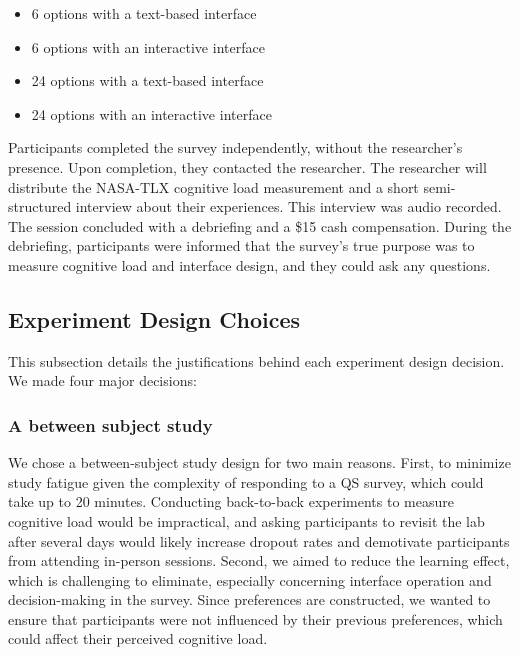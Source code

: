 \begin{itemize}
    \item 6 options with a text-based interface
    \item 6 options with an interactive interface
    \item 24 options with a text-based interface
    \item 24 options with an interactive interface
\end{itemize}

Participants completed the survey independently, without the researcher's presence. Upon completion, they contacted the researcher. The researcher will distribute the NASA-TLX cognitive load measurement and a short semi-structured interview about their experiences. This interview was audio recorded. The session concluded with a debriefing and a \$15 cash compensation. During the debriefing, participants were informed that the survey's true purpose was to measure cognitive load and interface design, and they could ask any questions.

\subsection{Experiment Design Choices}
This subsection details the justifications behind each experiment design decision. We made four major decisions:

\subsubsection{A between subject study}
We chose a between-subject study design for two main reasons. First, to minimize study fatigue given the complexity of responding to a QS survey, which could take up to 20 minutes. Conducting back-to-back experiments to measure cognitive load would be impractical, and asking participants to revisit the lab after several days would likely increase dropout rates and demotivate participants from attending in-person sessions. Second, we aimed to reduce the learning effect, which is challenging to eliminate, especially concerning interface operation and decision-making in the survey. Since preferences are constructed, we wanted to ensure that participants were not influenced by their previous preferences, which could affect their perceived cognitive load.

